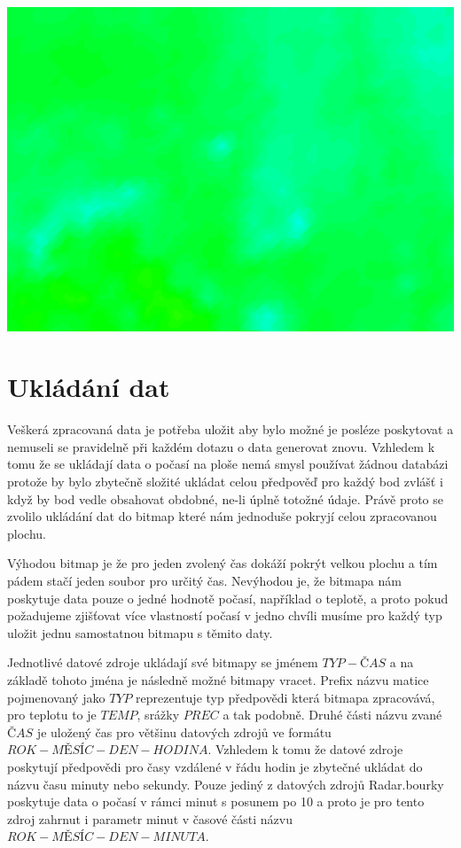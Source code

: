 \documentclass[czech,bachelor,dept460,male,csharp,cpdeclaration]{diploma}
\begin{document}
	\begin{center}
		\includegraphics[scale=0.5]{Data/bmp_vybarvena.png}
	\end{center}
	
	\section{Ukládání dat}
	
	Veškerá zpracovaná data je potřeba uložit aby bylo možné je posléze poskytovat a nemuseli se pravidelně při každém dotazu o data generovat znovu. Vzhledem k tomu že se ukládají data o počasí na ploše nemá smysl používat žádnou databázi protože by bylo zbytečně složité ukládat celou předpověď pro každý bod zvlášť i když by bod vedle obsahovat obdobné, ne-li úplně totožné údaje. Právě proto se zvolilo ukládání dat do bitmap které nám jednoduše pokryjí celou zpracovanou plochu.
	
	Výhodou bitmap je že pro jeden zvolený čas dokáží pokrýt velkou plochu a tím pádem stačí jeden soubor pro určitý čas. Nevýhodou je, že bitmapa nám poskytuje data pouze o jedné hodnotě počasí, například o teplotě, a proto pokud požadujeme zjišťovat více vlastností počasí v jedno chvíli musíme pro každý typ uložit jednu samostatnou bitmapu s těmito daty.
	
	Jednotlivé datové zdroje ukládají své bitmapy se jménem $TYP-ČAS$ a na základě tohoto jména je následně možné bitmapy vracet. Prefix názvu matice pojmenovaný jako $TYP$ reprezentuje typ předpovědi která bitmapa zpracovává, pro teplotu to je $TEMP$, srážky $PREC$ a tak podobně. Druhé části názvu zvané $ČAS$ je uložený čas pro většinu datových zdrojů ve formátu $ROK-MĚSÍC-DEN-HODINA$. Vzhledem k tomu že datové zdroje poskytují předpovědi pro časy vzdálené v řádu hodin je zbytečné ukládat do názvu času minuty nebo sekundy. Pouze jediný z datových zdrojů Radar.bourky poskytuje data o počasí v rámci minut s posunem po 10 a proto je pro tento zdroj zahrnut i parametr minut v časové části názvu $ROK-MĚSÍC-DEN-MINUTA$.
	
\end{document}
